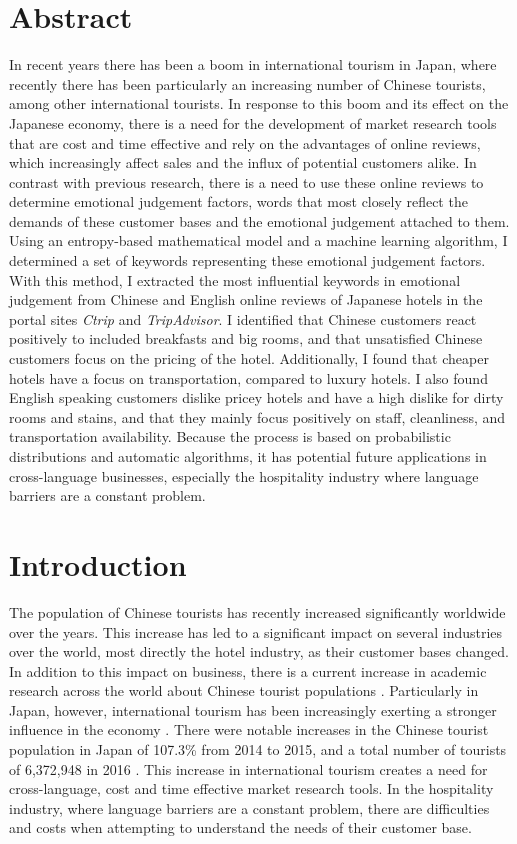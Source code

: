 \documentclass[review]{elsarticle}
\begin{document}
\section*{Abstract}
In recent years there has been a boom in international tourism in Japan, where recently there has been particularly an increasing number of Chinese tourists, among other international tourists. In response to this boom and its effect on the Japanese economy, there is a need for the development of market research tools that are cost and time effective and rely on the advantages of online reviews, which increasingly affect sales and the influx of potential customers alike. In contrast with previous research, there is a need to use these online reviews to determine emotional judgement factors, words that most closely reflect the demands of these customer bases and the emotional judgement attached to them. Using an entropy-based mathematical model and a machine learning algorithm, I determined a set of keywords representing these emotional judgement factors. With this method, I extracted the most influential keywords in emotional judgement from Chinese and English online reviews of Japanese hotels in the portal sites \textit{Ctrip} and \textit{TripAdvisor}. I identified that Chinese customers react positively to included breakfasts and big rooms, and that unsatisfied Chinese customers focus on the pricing of the hotel. Additionally, I found that cheaper hotels have a focus on transportation, compared to luxury hotels. I also found English speaking customers dislike pricey hotels and have a high dislike for dirty rooms and stains, and that they mainly focus positively on staff, cleanliness, and transportation availability. Because the process is based on probabilistic distributions and automatic algorithms, it has potential future applications in cross-language businesses, especially the hospitality industry where language barriers are a constant problem.

\section{Introduction}\label{intro}

The population of Chinese tourists has recently increased significantly worldwide over the years. This increase has led to a significant impact on several industries over the world, most directly the hotel industry, as their customer bases changed. In addition to this impact on business, there is a current increase in academic research across the world about Chinese tourist populations \cite{sun2017}. Particularly in Japan, however, international tourism has been increasingly exerting a stronger influence in the economy \cite{Jones2009}. There were notable increases in the Chinese tourist population in Japan of 107.3\% from 2014 to 2015, and a total number of tourists of 6,372,948 in 2016 \cite{jnto2017}. This increase in international tourism creates a need for cross-language, cost and time effective market research tools. In the hospitality industry, where language barriers are a constant problem, there are difficulties and costs when attempting to understand the needs of their customer base. 
\end{document}

